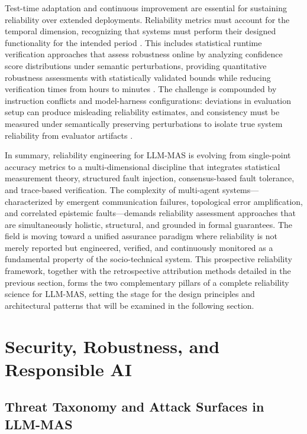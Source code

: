 \documentclass[11pt]{article}
\begin{document}
Test-time adaptation and continuous improvement are essential for sustaining reliability over extended deployments. Reliability metrics must account for the temporal dimension, recognizing that systems must perform their designed functionality for the intended period \cite{ref397}. This includes statistical runtime verification approaches that assess robustness online by analyzing confidence score distributions under semantic perturbations, providing quantitative robustness assessments with statistically validated bounds while reducing verification times from hours to minutes \cite{ref403}. The challenge is compounded by instruction conflicts and model-harness configurations: deviations in evaluation setup can produce misleading reliability estimates, and consistency must be measured under semantically preserving perturbations to isolate true system reliability from evaluator artifacts \cite{ref391,ref404}.

In summary, reliability engineering for LLM-MAS is evolving from single-point accuracy metrics to a multi-dimensional discipline that integrates statistical measurement theory, structured fault injection, consensus-based fault tolerance, and trace-based verification. The complexity of multi-agent systems---characterized by emergent communication failures, topological error amplification, and correlated epistemic faults---demands reliability assessment approaches that are simultaneously holistic, structural, and grounded in formal guarantees. The field is moving toward a unified assurance paradigm where reliability is not merely reported but engineered, verified, and continuously monitored as a fundamental property of the socio-technical system. This prospective reliability framework, together with the retrospective attribution methods detailed in the previous section, forms the two complementary pillars of a complete reliability science for LLM-MAS, setting the stage for the design principles and architectural patterns that will be examined in the following section.

\section{Security, Robustness, and Responsible AI}

\subsection{Threat Taxonomy and Attack Surfaces in LLM-MAS}
\end{document}

